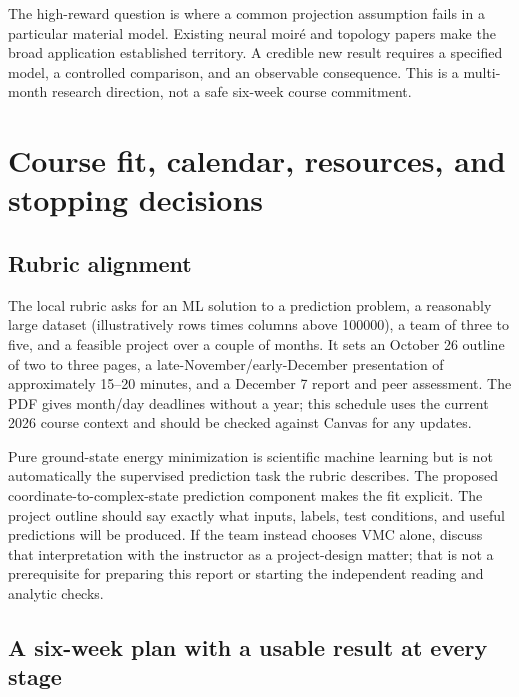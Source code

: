 \documentclass[11pt,letterpaper]{article}
\begin{document}
The high-reward question is where a common projection assumption fails in a particular material model. Existing neural moir\'e and topology papers make the broad application established territory. A credible new result requires a specified model, a controlled comparison, and an observable consequence. This is a multi-month research direction, not a safe six-week course commitment.

\section{Course fit, calendar, resources, and stopping decisions}
\label{sec:calendar}

\subsection{Rubric alignment}

The local rubric asks for an ML solution to a prediction problem, a reasonably large dataset (illustratively rows times columns above 100000), a team of three to five, and a feasible project over a couple of months. It sets an October 26 outline of two to three pages, a late-November/early-December presentation of approximately 15--20 minutes, and a December 7 report and peer assessment. The PDF gives month/day deadlines without a year; this schedule uses the current 2026 course context and should be checked against Canvas for any updates.

Pure ground-state energy minimization is scientific machine learning but is not automatically the supervised prediction task the rubric describes. The proposed coordinate-to-complex-state prediction component makes the fit explicit. The project outline should say exactly what inputs, labels, test conditions, and useful predictions will be produced. If the team instead chooses VMC alone, discuss that interpretation with the instructor as a project-design matter; that is not a prerequisite for preparing this report or starting the independent reading and analytic checks.

\subsection{A six-week plan with a usable result at every stage}
\end{document}
